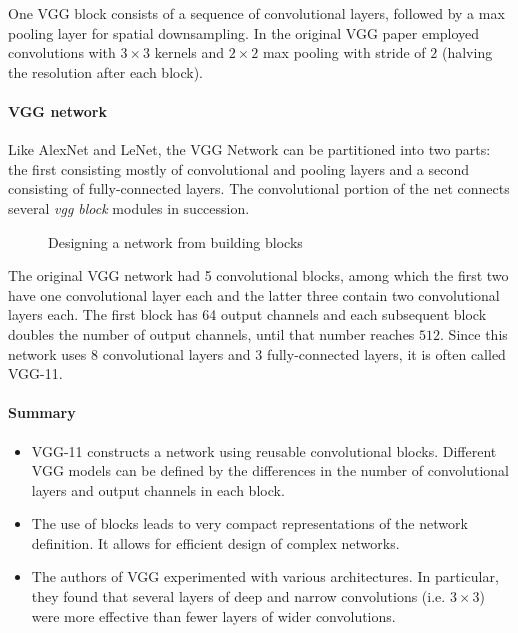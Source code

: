 One VGG block consists of a sequence of convolutional layers,  followed by a max pooling layer for spatial downsampling. In the original VGG paper \citet{Simonyan2015} employed convolutions with $3\times3$ kernels and $2 \times 2$ max pooling with stride of $2$ (halving the resolution after each block).

\paragraph{VGG network}

Like AlexNet and LeNet, the VGG Network can be partitioned into two parts: the first consisting mostly of convolutional and pooling layers and a second consisting of fully-connected layers. The convolutional portion of the net connects several \textit{vgg block} modules in succession.

\begin{figure}[hpt]
	\centering
	
	\caption{Designing a network from building blocks}
	\label{fig:vgg}
\end{figure}

The original VGG network had 5 convolutional blocks, among which the first two have one convolutional layer each and the latter three contain two convolutional layers each. The first block has 64 output channels and each subsequent block doubles the number of output channels, until that number reaches $512$. Since this network uses $8$ convolutional layers and $3$ fully-connected layers, it is often called VGG-11.

\paragraph{Summary}

\begin{itemize}
    \item VGG-11 constructs a network using reusable convolutional blocks. Different VGG models can be defined by the differences in the number of convolutional layers and output channels in each block.
    \item The use of blocks leads to very compact representations of the network definition. It allows for efficient design of complex networks.
    \item The authors of VGG experimented with various architectures. In particular, they found that several layers of deep and narrow convolutions (i.e. $3 \times 3$) were more effective than fewer layers of wider convolutions.
\end{itemize}

